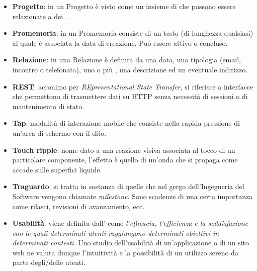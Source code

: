 \begin{itemize}
\item \textbf{Progetto}: in \fiscolo{} un Progetto è visto come un insieme di 
che possono essere relazionate a dei .

\item \textbf{Promemoria}: in \fiscolo{} un Promemoria consiste di un testo (di lunghezza
qualsiasi) al quale è associata la data di creazione. Può essere attivo o concluso.

\item \textbf{Relazione}: in \fiscolo{} una Relazione è definita da una data, una tipologia
(email, incontro o telefonata), uno o più , una descrizione ed un eventuale
indirizzo.

\item \textbf{REST}: acronimo per \textit{REpresentational State Transfer}, si riferisce a
interfacce che permettono di trasmettere dati su HTTP senza necessità di sessioni o di
mantenimento di stato.

\item \textbf{Tap}: modalità di interazione mobile che consiste nella rapida pressione
di un'area di schermo con il dito.

\item \textbf{Touch ripple}: nome dato a una reazione visiva associata al tocco di un
particolare componente, l'effetto è quello di un'onda che si propaga come accade sulle
superfici liquide.

\item \textbf{Traguardo}: si tratta in sostanza di quelle che nel gergo dell'Ingegneria del
Software vengono chiamate \textit{milestone}. Sono scadenze di una certa importanza come
rilasci, revisioni di avanzamento, ecc.

\item \textbf{Usabilità}: viene definita dall' come \textit{l'efficacia, l'efficienza
e la soddisfazione con le quali determinati utenti raggiungono determinati obiettivi in
determinati contesti}. Uno studio dell'usabilità di un'applicazione o di un sito web ne valuta
dunque l'intuitività e la possibilità di un utilizzo sereno da parte degli/delle utenti.
\end{itemize}